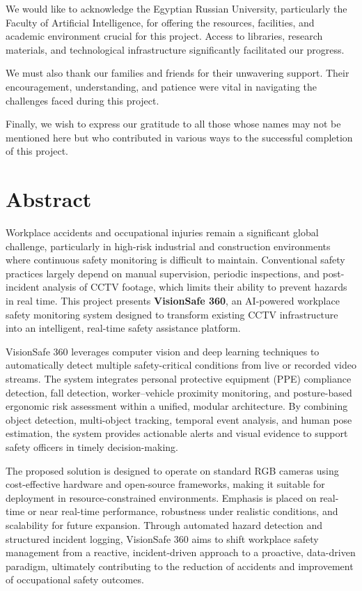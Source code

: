 We would like to acknowledge the Egyptian Russian University, particularly the Faculty of Artificial Intelligence, for offering the resources, facilities, and academic environment crucial for this project. Access to libraries, research materials, and technological infrastructure significantly facilitated our progress.

We must also thank our families and friends for their unwavering support. Their encouragement, understanding, and patience were vital in navigating the challenges faced during this project.

Finally, we wish to express our gratitude to all those whose names may not be mentioned here but who contributed in various ways to the successful completion of this project.

\chapter*{Abstract}

Workplace accidents and occupational injuries remain a significant global challenge, particularly in high-risk industrial and construction environments where continuous safety monitoring is difficult to maintain. Conventional safety practices largely depend on manual supervision, periodic inspections, and post-incident analysis of CCTV footage, which limits their ability to prevent hazards in real time. This project presents \textbf{VisionSafe 360}, an AI-powered workplace safety monitoring system designed to transform existing CCTV infrastructure into an intelligent, real-time safety assistance platform.

VisionSafe 360 leverages computer vision and deep learning techniques to automatically detect multiple safety-critical conditions from live or recorded video streams. The system integrates personal protective equipment (PPE) compliance detection, fall detection, worker--vehicle proximity monitoring, and posture-based ergonomic risk assessment within a unified, modular architecture. By combining object detection, multi-object tracking, temporal event analysis, and human pose estimation, the system provides actionable alerts and visual evidence to support safety officers in timely decision-making.

The proposed solution is designed to operate on standard RGB cameras using cost-effective hardware and open-source frameworks, making it suitable for deployment in resource-constrained environments. Emphasis is placed on real-time or near real-time performance, robustness under realistic conditions, and scalability for future expansion. Through automated hazard detection and structured incident logging, VisionSafe 360 aims to shift workplace safety management from a reactive, incident-driven approach to a proactive, data-driven paradigm, ultimately contributing to the reduction of accidents and improvement of occupational safety outcomes.

